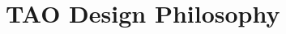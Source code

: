 \begin{comment}   

The Toolkit for Advanced Optimization (TAO) focuses on the design of large
scale optimization software, including nonlinear least
squares, unconstrained minimization, bound constrained
optimization, and decomposition techniques.
The solution of such problems
pervades many areas of computational science and demands robust and
flexible solution strategies.
As surveyed by Mor\'e and Wright \cite{optguide93},
various software packages are available for solving these
problems; however, their portability, versatility, and scalability are
restricted, especially within parallel environments.

The current generation of numerical software generally has a rigid form
that imposes many limitations, even when restricted to
uniprocessor architectures.
In traditional software design, the expressions of
algorithms make assumptions about the way mathematical objects, such as
vectors and matrices, are represented by the computer.
Thus, users are
forced to convert from the natural representation of data for a particular
application to one imposed by the software developer, often at the
expense of considerable overhead.  In addition, library routines are
often characterized by long and complicated calling sequences, with
no consistent interface among algorithms that solve a particular class
of problems.

These issues are magnified by the very nature of multiprocessor
architectures, since robust and
efficient implementation of mathematical abstractions involves
the added considerations
of parallel data structures and communication.
An effective software package should
exploit different parallel programming
techniques for various phases of the solution process.

Since many application problems require the computational
power of high-performance computers, a need clearly exists for a
uniform and flexible framework for developing optimization software and
solving application programs.
Our goal is to use object-oriented and component-based
software engineering techniques to create such an environment.

\end{comment}

\section{TAO Design Philosophy} 

